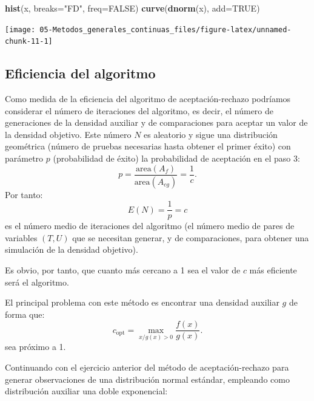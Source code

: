 \documentclass[]{book}
\newenvironment{Shaded}{\begin{snugshade}}{\end{snugshade}}
\newcommand{\KeywordTok}[1]{\textcolor[rgb]{0.13,0.29,0.53}{\textbf{#1}}}
\newcommand{\DataTypeTok}[1]{\textcolor[rgb]{0.13,0.29,0.53}{#1}}
\newcommand{\StringTok}[1]{\textcolor[rgb]{0.31,0.60,0.02}{#1}}
\newcommand{\OtherTok}[1]{\textcolor[rgb]{0.56,0.35,0.01}{#1}}
\newcommand{\NormalTok}[1]{#1}
\theoremstyle{definition}
\theoremstyle{definition}
\theoremstyle{definition}
\theoremstyle{remark}
\let\BeginKnitrBlock\begin \let\EndKnitrBlock\end
\begin{document}
\begin{enumerate}
\begin{Shaded}
\begin{Highlighting}[]
\KeywordTok{hist}\NormalTok{(x, }\DataTypeTok{breaks=}\StringTok{"FD"}\NormalTok{, }\DataTypeTok{freq=}\OtherTok{FALSE}\NormalTok{)}
\KeywordTok{curve}\NormalTok{(}\KeywordTok{dnorm}\NormalTok{(x), }\DataTypeTok{add=}\OtherTok{TRUE}\NormalTok{)}
\end{Highlighting}
\end{Shaded}

  \begin{center}\texttt{[image: 05-Metodos\_generales\_continuas\_files/figure-latex/unnamed-chunk-11-1]} \end{center}
\end{enumerate}

\subsection{Eficiencia del algoritmo}\label{eficiencia-del-algoritmo}

Como medida de la eficiencia del algoritmo de aceptación-rechazo
podríamos considerar el número de iteraciones del algoritmo, es decir,
el número de generaciones de la densidad auxiliar y de comparaciones
para aceptar un valor de la densidad objetivo. Este número \(N\) es
aleatorio y sigue una distribución geométrica (número de pruebas
necesarias hasta obtener el primer éxito) con parámetro \(p\)
(probabilidad de éxito) la probabilidad de aceptación en el paso 3:
\[p = \frac{\text{area}\left(
        A_{f}\right) }{\text{area}\left( A_{cg}\right) }=\frac{1}{c}.\]
Por tanto: \[E\left( N \right) = \frac1p = c\] es el número medio de
iteraciones del algoritmo (el número medio de pares de variables
\(\left( T,U\right)\) que se necesitan generar, y de comparaciones, para
obtener una simulación de la densidad objetivo).

Es obvio, por tanto, que cuanto más cercano a 1 sea el valor de \(c\)
más eficiente será el algoritmo.

El principal problema con este método es encontrar una densidad auxiliar
\(g\) de forma que: \[c_{\text{opt}}=\max_{x/g\left( x\right) >0}
\frac{f\left( x\right) }{g\left( x\right) }.\] sea próximo a 1.

\BeginKnitrBlock{exercise}
\protect\hypertarget{exr:unnamed-chunk-12}{}{\label{exr:unnamed-chunk-12} }
\EndKnitrBlock{exercise}

Continuando con el ejercicio anterior del método de aceptación-rechazo
para generar observaciones de una distribución normal estándar,
empleando como distribución auxiliar una doble exponencial:
\end{document}
